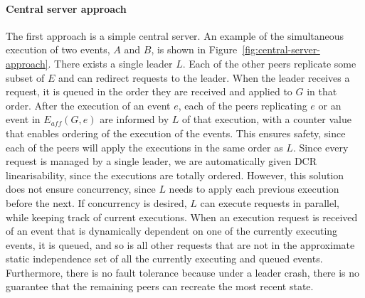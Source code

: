 \documentclass{article}
\begin{document}
	\paragraph{Central server approach}
	The first approach is a simple central server.
    An example of the simultaneous execution of two events, $A$ and $B$, is shown in Figure~\ref{fig:central-server-approach}.
	There exists a single leader $L$. Each of the other peers replicate some subset of $E$ and can redirect requests to the leader.
	When the leader receives a request, it is queued in the order they are received and applied to $G$ in that order.
	After the execution of an event $e$, each of the peers replicating $e$ or an event in $E_{aff}(G,e)$ are informed by $L$ of that execution, with a counter value that enables ordering of the execution of the events.
	This ensures safety, since each of the peers will apply the executions in the same order as $L$.
	Since every request is managed by a single leader, we are automatically given DCR linearisability, since the executions are totally ordered.
	However, this solution does not ensure concurrency, since $L$ needs to apply each previous execution before the next.
	If concurrency is desired, $L$ can execute requests in parallel, while keeping track of current executions.
	When an execution request is received of an event that is dynamically dependent on one of the currently executing events, it is queued, and so is all other requests that are not in the approximate static independence set of all the currently executing and queued events.
	Furthermore, there is no fault tolerance because under a leader crash, there is no guarantee that the remaining peers can recreate the most recent state.
\end{document}
